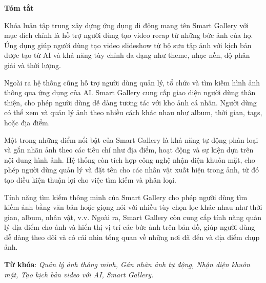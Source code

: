 \begin{center}
\textbf{\large{Tóm tắt}	}
\end{center}


\begin{small}
    Khóa luận tập trung xây dựng ứng dụng di động mang tên Smart Gallery với mục đích chính là hỗ trợ người dùng tạo video recap từ những bức ảnh của họ. Ứng dụng giúp người dùng tạo video slideshow từ bộ sưu tập ảnh với kịch bản được tạo từ AI và khả năng tùy chỉnh đa dạng như theme, nhạc nền, độ phân giải và thời lượng.
    
    Ngoài ra hệ thống cũng hỗ trợ người dùng quản lý, tổ chức và tìm kiếm hình ảnh thông qua ứng dụng của AI. Smart Gallery cung cấp giao diện người dùng thân thiện, cho phép người dùng dễ dàng tương tác với kho ảnh cá nhân. Người dùng có thể xem và quản lý ảnh theo nhiều cách khác nhau như album, thời gian, tags, hoặc địa điểm.

    Một trong những điểm nổi bật của Smart Gallery là khả năng tự động phân loại và gắn nhãn ảnh theo các tiêu chí như địa điểm, hoạt động và sự kiện dựa trên nội dung hình ảnh. Hệ thống còn tích hợp công nghệ nhận diện khuôn mặt, cho phép người dùng quản lý và đặt tên cho các nhân vật xuất hiện trong ảnh, từ đó tạo điều kiện thuận lợi cho việc tìm kiếm và phân loại.
    
    Tính năng tìm kiếm thông minh của Smart Gallery cho phép người dùng tìm kiếm ảnh bằng văn bản hoặc giọng nói với nhiều tùy chọn lọc khác nhau như thời gian, album, nhân vật, v.v. Ngoài ra, Smart Gallery còn cung cấp tính năng quản lý địa điểm cho ảnh và hiển thị vị trí các bức ảnh trên bản đồ, giúp người dùng dễ dàng theo dõi và có cái nhìn tổng quan về những nơi đã đến và địa điểm chụp ảnh.


\vspace*{1cm}
\textbf{Từ khóa}: 
\textit{Quản lý ảnh thông minh, Gán nhãn ảnh tự động, Nhận diện khuôn mặt, Tạo kịch bản video với AI, Smart Gallery.}
\end{small}